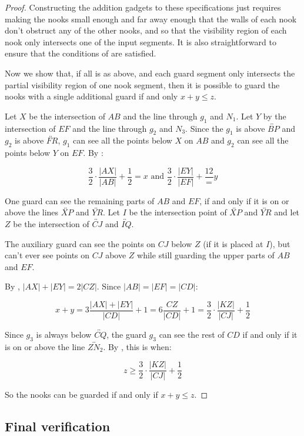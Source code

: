 \documentclass[11pt]{article}
\theoremstyle{plain}
\theoremstyle{definition}
\numberwithin{theorem}{section}
\begin{document}
\begin{proof}
Constructing the addition gadgets to these specifications just requires making the nooks small enough and far away enough that the walls of each nook don't obstruct any of the other nooks, and so that the visibility region of each nook only intersects one of the input segments. It is also straightforward to ensure that the conditions of  are satisfied.

Now we show that, if all is as above, and each guard segment only intersects the partial visibility region of one nook segment, then it is possible to guard the nooks with a single additional guard if and only $x+y\le z$.

Let $X$ be the intersection of $AB$ and the line through $g_1$ and $N_1$. Let $Y$ by the intersection of $EF$ and the line through $g_2$ and $N_3$. Since the $g_1$ is above $\overleftrightarrow{BP}$ and $g_2$ is above $\overleftrightarrow{FR}$, $g_1$ can see all the points below $X$ on $AB$ and $g_2$ can see all the points below $Y$ on $EF$. By :

\[\frac32\cdot\frac{|AX|}{|AB|}+\frac12=x\text{ and }\frac32\cdot\frac{|EY|}{|EF|}+\frac{12}=y\]

One guard can see the remaining parts of $AB$ and $EF$, if and only if it is on or above the lines $\overleftrightarrow{XP}$ and $\overleftrightarrow{YR}$. Let $I$ be the intersection point of $\overleftrightarrow{XP}$ and $\overleftrightarrow{YR}$ and let $Z$ be the intersection of $\overleftrightarrow{CJ}$ and $\overleftrightarrow{IQ}$.

The auxiliary guard can see the points on $CJ$ below $Z$ (if it is placed at $I$), but can't ever see points on $CJ$ above $Z$ while still guarding the upper parts of $AB$ and $EF$.

By , $|AX|+|EY|=2|CZ|$. Since $|AB|=|EF|=|CD|$:

\[x+y=3\frac{|AX|+|EY|}{|CD|}+1=6\frac{CZ}{|CD|}+1=\frac{3}{2}\cdot\frac{|KZ|}{|CJ|}+\frac{1}{2}\]

Since $g_3$ is always below $\overleftrightarrow{CQ}$, the guard $g_3$ can see the rest of $CD$ if and only if it is on or above the line $\overleftrightarrow{ZN_2}$. By , this is when:

\[z\ge \frac{3}{2}\cdot\frac{|KZ|}{|CJ|}+\frac{1}{2}\]

So the nooks can be guarded if and only if $x+y\le z$. 
\end{proof}

\subsection{Final verification}
\end{document}
